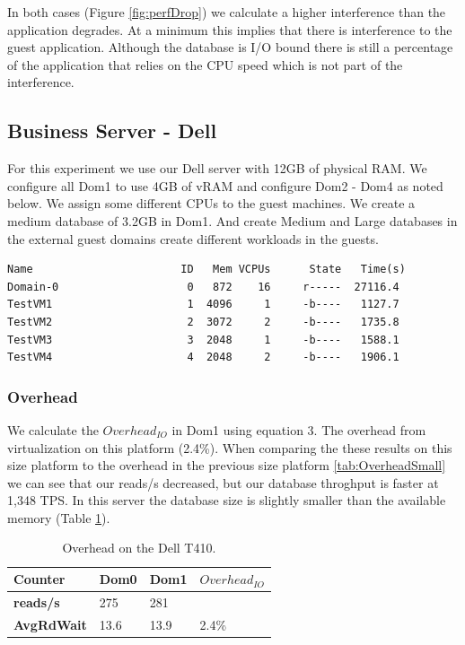 In both cases (Figure \ref{fig:perfDrop}) we calculate a higher interference than the application degrades.  At a minimum this implies that there is interference to the guest application.  Although the database is I/O bound there is still a percentage of the application that relies on the CPU speed which is not part of the interference.  

\subsection{Business Server - Dell}
For this experiment we use our Dell server with 12GB of physical RAM. We configure all Dom1 to use 4GB of vRAM and configure Dom2 - Dom4 as noted below.  We assign some different CPUs to the guest machines. We create a medium database of 3.2GB in Dom1.   And create Medium and Large databases in the external guest domains create different workloads in the guests.

\begin{Verbatim}
Name                       ID   Mem VCPUs      State   Time(s)
Domain-0                    0   872    16     r-----  27116.4
TestVM1                     1  4096     1     -b----   1127.7
TestVM2                     2  3072     2     -b----   1735.8
TestVM3                     3  2048     1     -b----   1588.1
TestVM4                     4  2048     2     -b----   1906.1
\end{Verbatim}

\subsubsection{Overhead}
We calculate the $Overhead_{IO}$ in Dom1 using equation 3.  The overhead from virtualization on this platform (2.4\%).   When comparing the these results on this size platform to the overhead in the previous size platform \ref{tab:OverheadSmall} we can see that our reads/s  decreased, but our database throghput is faster at 1,348 TPS.  In this server the database size is slightly smaller than the available memory (Table \ref{tab:OverheadDell}).

\begin{table}[h]
\begin{tabular}{ l l l p{5cm} }
  Counter     & Dom0 & Dom1 & $Overhead_{IO}$ \\
  \hline
    \textbf{reads/s}    & 275  & 281 & \\
    \textbf{AvgRdWait}  & 13.6 & 13.9 & 2.4\% \\ 
  \hline
\end{tabular}
\caption{Overhead on the Dell T410.}
\label{tab:OverheadDell}
\end{table}

